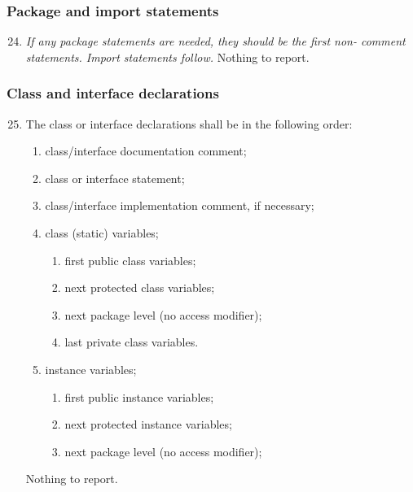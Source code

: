	\subsubsection{Package and import statements}
		\begin{enumerate}
			\setcounter{enumi}{23}
			\item \textit{If any package statements are needed, they should be the first non- comment statements. Import statements follow.}\newline
			Nothing to report.
		\end{enumerate}

	\subsubsection{Class and interface declarations}
		\begin{enumerate}
			\setcounter{enumi}{24}
			\item \begin{itshape}
				The class or interface declarations shall be in the following order:
				\begin{enumerate}[label={(\alph*)}]
					\item class/interface documentation comment;
					\item class or interface statement;
					\item class/interface implementation comment, if necessary;
					\item class (static) variables;
						\begin{enumerate}[label=\roman*]
							\item first public class variables;
							\item next protected class variables;
							\item next package level (no access modifier);
							\item last private class variables.
						\end{enumerate}
					\item instance variables;
						\begin{enumerate}[label=\roman*]
							\item first public instance variables;
							\item next protected instance variables;
							\item next package level (no access modifier);
						\end{enumerate}
				\end{enumerate}
			\end{itshape}
			Nothing to report.


\end{enumerate}
